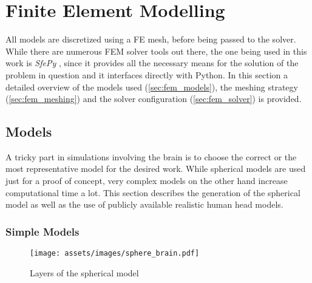 \pagebreak
\chapter{Finite Element Modelling}

All models are discretized using a \gls{FE} mesh, before being passed to the solver. While there are numerous \gls{FEM} solver tools out there, the one being used in this work is \textit{SfePy} \cite{Cimrman2019}, since it provides all the necessary means for the solution of the problem in question and it interfaces directly with Python. In this section a detailed overview of the models used (\autoref{sec:fem_models}), the meshing strategy (\autoref{sec:fem_meshing}) and the solver configuration (\autoref{sec:fem_solver}) is provided.

\section{Models}
\label{sec:fem_models}

A tricky part in simulations involving the brain is to choose the correct or the most representative model for the desired work. While spherical models are used just for a proof of concept, very complex models on the other hand increase computational time a lot. This section describes the generation of the spherical model as well as the use of publicly available realistic human head models.

\subsection{Simple Models}
\begin{wrapfigure}{r}{0.35\textwidth}
    \centering
    \texttt{[image: assets/images/sphere\_brain.pdf]}
    \caption{Layers of the spherical model}
    \vspace{-4cm}
    \label{fig:sphere_brain}
\end{wrapfigure}

